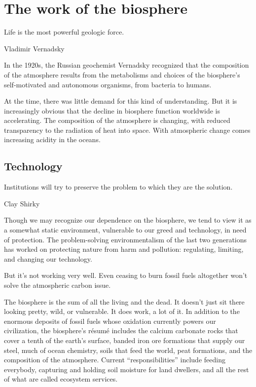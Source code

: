 \documentclass[11pt,letterpaper,oneside,onecolumn]{memoir}
\begin{document}

\chapter{The work of the biosphere}

\epigraph{Life is the most powerful geologic force.}{Vladimir Vernadsky}

\noindent In the 1920s, the Russian geochemist Vernadsky recognized that the composition of the atmosphere results from the metabolisms and choices of the biosphere's self-motivated and autonomous organisms, from bacteria to humans.

At the time, there was little demand for this kind of understanding. But it is increasingly obvious that the decline in biosphere function worldwide is accelerating. The composition of the atmosphere is changing, with reduced transparency to the radiation of heat into space. With atmospheric change comes increasing acidity in the oceans.

\section{Technology}

\epigraph{Institutions will try to preserve the problem to which they are the solution.}{Clay Shirky}

\noindent Though we may recognize our dependence on the biosphere, we tend to view it as a somewhat static environment, vulnerable to our greed and technology, in need of protection. The problem-solving environmentalism of the last two generations has worked on protecting nature from harm and pollution: regulating, limiting, and changing our technology.

But it's not working very well. Even ceasing to burn fossil fuels altogether won't solve the atmospheric carbon issue.

The biosphere is the sum of all the living and the dead. It doesn't just sit there looking pretty, wild, or vulnerable. It does work, a lot of it. In addition to the enormous deposits of fossil fuels whose oxidation currently powers our civilization, the biosphere's r\'{e}sum\'{e} includes the calcium carbonate rocks that cover a tenth of the earth's surface, banded iron ore formations that supply our steel, much of ocean chemistry, soils that feed the world, peat formations, and the composition of the atmosphere. Current ``responsibilities'' include feeding everybody, capturing and holding soil moisture for land dwellers, and all the rest of what are called ecosystem services.
\end{document}

